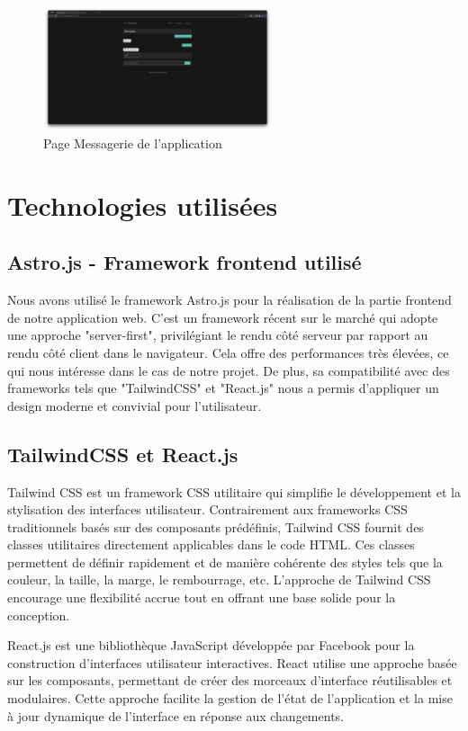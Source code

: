 \documentclass[12pt, a4paper, oneside]{thesis}
\begin{document}
\begin{figure}[h]
    \centering
    \includegraphics[width=0.6\textwidth]{images/PageMessagerieApplication.png}
    \caption{Page Messagerie de l'application}
\end{figure}

\section{Technologies utilisées}
\subsection{Astro.js - Framework frontend utilisé}
Nous avons utilisé le framework Astro.js pour la réalisation de la partie frontend de notre application web. C'est un framework récent sur le marché qui adopte une approche "server-first", privilégiant le rendu côté serveur par rapport au rendu côté client dans le navigateur. Cela offre des performances très élevées, ce qui nous intéresse dans le cas de notre projet. De plus, sa compatibilité avec des frameworks tels que "TailwindCSS" et "React.js" nous a permis d'appliquer un design moderne et convivial pour l'utilisateur.

\subsection{TailwindCSS et React.js}
Tailwind CSS est un framework CSS utilitaire qui simplifie le développement et la stylisation des interfaces utilisateur. Contrairement aux frameworks CSS traditionnels basés sur des composants prédéfinis, Tailwind CSS fournit des classes utilitaires directement applicables dans le code HTML. Ces classes permettent de définir rapidement et de manière cohérente des styles tels que la couleur, la taille, la marge, le rembourrage, etc. L'approche de Tailwind CSS encourage une flexibilité accrue tout en offrant une base solide pour la conception.

React.js est une bibliothèque JavaScript développée par Facebook pour la construction d'interfaces utilisateur interactives. React utilise une approche basée sur les composants, permettant de créer des morceaux d'interface réutilisables et modulaires. Cette approche facilite la gestion de l'état de l'application et la mise à jour dynamique de l'interface en réponse aux changements.
\end{document}
